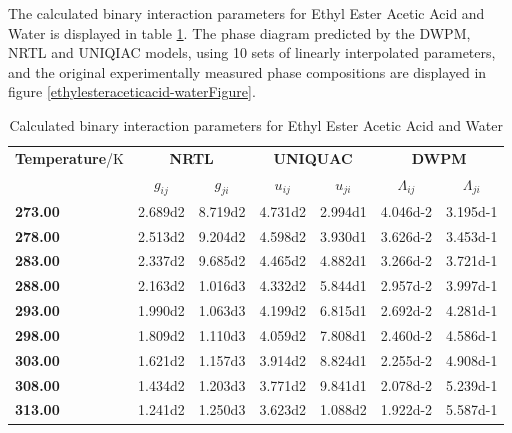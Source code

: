 \clearpage


The calculated binary interaction parameters for Ethyl Ester Acetic Acid and Water is displayed in table \ref{ethylesteraceticacid-waterTable}. The phase diagram predicted by the DWPM, NRTL and UNIQIAC models, using 10 sets of linearly interpolated parameters, and the original experimentally measured phase compositions are displayed in figure \ref{ethylesteraceticacid-waterFigure}.\\

\begin{landscape}
\vspace*{\fill}
\begin{table}[h]
\caption{Calculated binary interaction parameters for Ethyl Ester Acetic Acid and Water}
\centering
\begin{tabular}{lcccccc}
\toprule
\textbf{Temperature}/$\mathrm{K}$&\multicolumn{2}{c}{\textbf{NRTL}}&\multicolumn{2}{c}{\textbf{UNIQUAC}}&\multicolumn{2}{c}{\textbf{DWPM}}\\
\cmidrule(r){2-7}
&$g_{ij}$&$g_{ji}$&$u_{ij}$&$u_{ji}$&$\Lambda_{ij}$&$\Lambda_{ji}$\\
\midrule
\textbf{ 273.00 } & \num{2.689d2} & \num{8.719d2} & \num{4.731d2} & \num{2.994d1} & \num{4.046d-2} & \num{3.195d-1}\\
\textbf{ 278.00 } & \num{2.513d2} & \num{9.204d2} & \num{4.598d2} & \num{3.930d1} & \num{3.626d-2} & \num{3.453d-1}\\
\textbf{ 283.00 } & \num{2.337d2} & \num{9.685d2} & \num{4.465d2} & \num{4.882d1} & \num{3.266d-2} & \num{3.721d-1}\\
\textbf{ 288.00 } & \num{2.163d2} & \num{1.016d3} & \num{4.332d2} & \num{5.844d1} & \num{2.957d-2} & \num{3.997d-1}\\
\textbf{ 293.00 } & \num{1.990d2} & \num{1.063d3} & \num{4.199d2} & \num{6.815d1} & \num{2.692d-2} & \num{4.281d-1}\\
\textbf{ 298.00 } & \num{1.809d2} & \num{1.110d3} & \num{4.059d2} & \num{7.808d1} & \num{2.460d-2} & \num{4.586d-1}\\
\textbf{ 303.00 } & \num{1.621d2} & \num{1.157d3} & \num{3.914d2} & \num{8.824d1} & \num{2.255d-2} & \num{4.908d-1}\\
\textbf{ 308.00 } & \num{1.434d2} & \num{1.203d3} & \num{3.771d2} & \num{9.841d1} & \num{2.078d-2} & \num{5.239d-1}\\
\textbf{ 313.00 } & \num{1.241d2} & \num{1.250d3} & \num{3.623d2} & \num{1.088d2} & \num{1.922d-2} & \num{5.587d-1}\\
\bottomrule
\end{tabular}\\
\label{ethylesteraceticacid-waterTable}
\end{table}
\vspace*{\fill}
\end{landscape}


